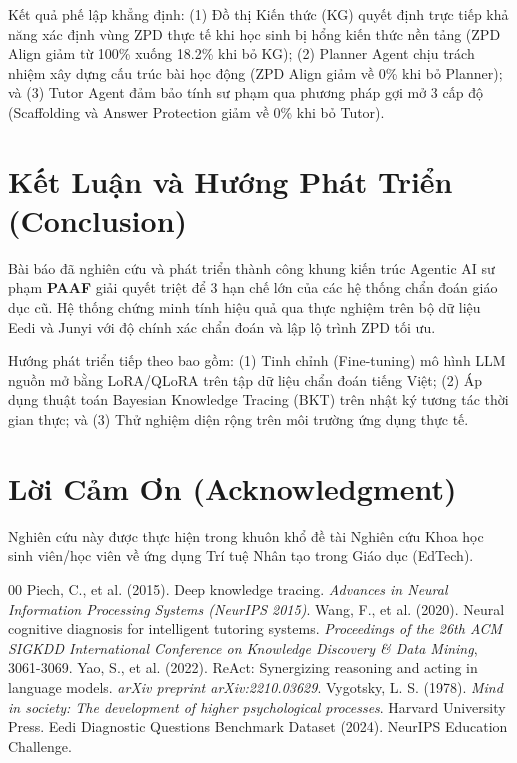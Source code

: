 \documentclass[conference]{IEEEtran}
\begin{document}
Kết quả phế lập khẳng định: (1) Đồ thị Kiến thức (KG) quyết định trực tiếp khả năng xác định vùng ZPD thực tế khi học sinh bị hổng kiến thức nền tảng (ZPD Align giảm từ 100\% xuống 18.2\% khi bỏ KG); (2) Planner Agent chịu trách nhiệm xây dựng cấu trúc bài học động (ZPD Align giảm về 0\% khi bỏ Planner); và (3) Tutor Agent đảm bảo tính sư phạm qua phương pháp gợi mở 3 cấp độ (Scaffolding và Answer Protection giảm về 0\% khi bỏ Tutor).

\section{Kết Luận và Hướng Phát Triển (Conclusion)}
Bài báo đã nghiên cứu và phát triển thành công khung kiến trúc Agentic AI sư phạm \textbf{PAAF} giải quyết triệt để 3 hạn chế lớn của các hệ thống chẩn đoán giáo dục cũ. Hệ thống chứng minh tính hiệu quả qua thực nghiệm trên bộ dữ liệu Eedi và Junyi với độ chính xác chẩn đoán và lập lộ trình ZPD tối ưu. 

Hướng phát triển tiếp theo bao gồm: (1) Tinh chỉnh (Fine-tuning) mô hình LLM nguồn mở bằng LoRA/QLoRA trên tập dữ liệu chẩn đoán tiếng Việt; (2) Áp dụng thuật toán Bayesian Knowledge Tracing (BKT) trên nhật ký tương tác thời gian thực; và (3) Thử nghiệm diện rộng trên môi trường ứng dụng thực tế.

\section*{Lời Cảm Ơn (Acknowledgment)}
Nghiên cứu này được thực hiện trong khuôn khổ đề tài Nghiên cứu Khoa học sinh viên/học viên về ứng dụng Trí tuệ Nhân tạo trong Giáo dục (EdTech).

\begin{thebibliography}{00}
 Piech, C., et al. (2015). Deep knowledge tracing. \textit{Advances in Neural Information Processing Systems (NeurIPS 2015)}.
 Wang, F., et al. (2020). Neural cognitive diagnosis for intelligent tutoring systems. \textit{Proceedings of the 26th ACM SIGKDD International Conference on Knowledge Discovery \& Data Mining}, 3061-3069.
 Yao, S., et al. (2022). ReAct: Synergizing reasoning and acting in language models. \textit{arXiv preprint arXiv:2210.03629}.
 Vygotsky, L. S. (1978). \textit{Mind in society: The development of higher psychological processes}. Harvard University Press.
 Eedi Diagnostic Questions Benchmark Dataset (2024). NeurIPS Education Challenge.
\end{thebibliography}
\end{document}
